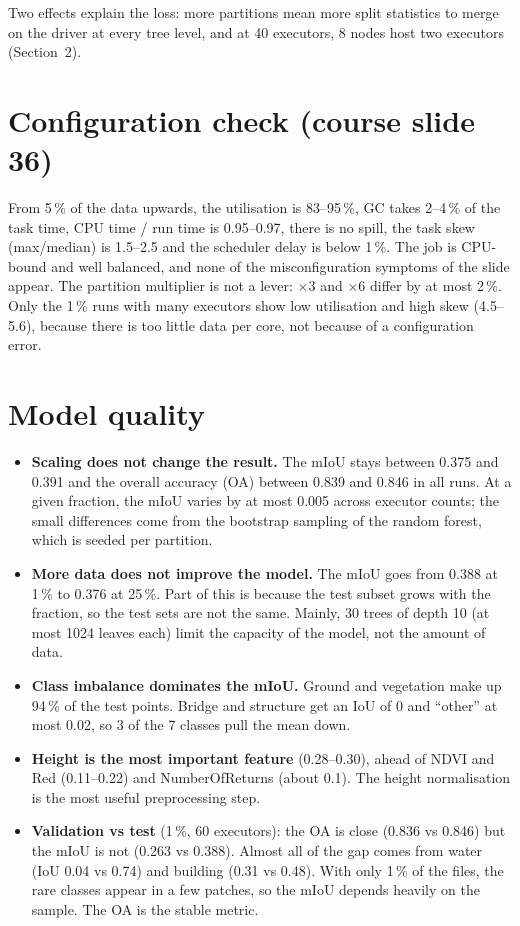 \documentclass[a4paper, 11pt]{article}
\begin{document}
Two effects explain the loss: more partitions mean more split statistics to merge on the driver at
every tree level, and at 40 executors, 8 nodes host two executors (Section~2).

\section{Configuration check (course slide 36)}

From 5\,\% of the data upwards, the utilisation is 83--95\,\%, GC takes 2--4\,\% of the task time,
CPU time / run time is 0.95--0.97, there is no spill, the task skew (max/median) is 1.5--2.5 and the
scheduler delay is below 1\,\%. The job is CPU-bound and well balanced, and none of the
misconfiguration symptoms of the slide appear. The partition multiplier is not a lever: $\times 3$ and
$\times 6$ differ by at most 2\,\%. Only the 1\,\% runs with many executors show low utilisation and
high skew (4.5--5.6), because there is too little data per core, not because of a configuration error.

\section{Model quality}

\begin{itemize}
  \item \textbf{Scaling does not change the result.} The mIoU stays between 0.375 and 0.391 and the
  overall accuracy (OA) between 0.839 and 0.846 in all runs. At a given fraction, the mIoU varies by at
  most 0.005 across executor counts; the small differences come from the bootstrap sampling of the
  random forest, which is seeded per partition.
  \item \textbf{More data does not improve the model.} The mIoU goes from 0.388 at 1\,\% to 0.376 at
  25\,\%. Part of this is because the test subset grows with the fraction, so the test sets are not the
  same. Mainly, 30 trees of depth 10 (at most 1024 leaves each) limit the capacity of the model, not the
  amount of data.
  \item \textbf{Class imbalance dominates the mIoU.} Ground and vegetation make up 94\,\% of the test
  points. Bridge and structure get an IoU of 0 and ``other'' at most 0.02, so 3 of the 7 classes pull the
  mean down.
  \item \textbf{Height is the most important feature} (0.28--0.30), ahead of NDVI and Red (0.11--0.22)
  and NumberOfReturns (about 0.1). The height normalisation is the most useful preprocessing step.
  \item \textbf{Validation vs test} (1\,\%, 60 executors): the OA is close (0.836 vs 0.846) but the mIoU
  is not (0.263 vs 0.388). Almost all of the gap comes from water (IoU 0.04 vs 0.74) and building
  (0.31 vs 0.48). With only 1\,\% of the files, the rare classes appear in a few patches, so the mIoU
  depends heavily on the sample. The OA is the stable metric.
\end{itemize}
\end{document}
